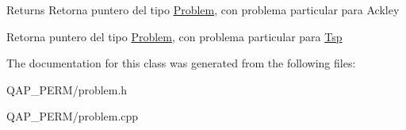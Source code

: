 \begin{DoxyReturn}{Returns}
Retorna puntero del tipo \hyperlink{class_problem}{Problem}, con problema particular para Ackley

Retorna puntero del tipo \hyperlink{class_problem}{Problem}, con problema particular para \hyperlink{class_tsp}{Tsp} 
\end{DoxyReturn}


The documentation for this class was generated from the following files\+:\begin{DoxyCompactItemize}
\item 
Q\+A\+P\+\_\+\+P\+E\+R\+M/problem.\+h\item 
Q\+A\+P\+\_\+\+P\+E\+R\+M/problem.\+cpp\end{DoxyCompactItemize}
